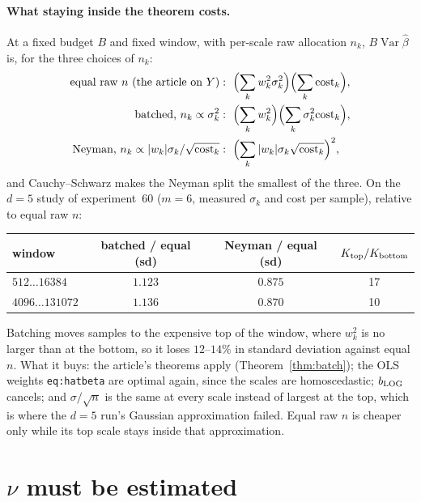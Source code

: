 \documentclass[11pt]{article}
\newcommand{\Var}{\operatorname{Var}}
\newcommand{\cost}{\mathrm{cost}}
\newcommand{\lbl}[1]{\texttt{#1}}
\begin{document}
\paragraph{What staying inside the theorem costs.} At a fixed budget $B$ and
fixed window, with per-scale raw allocation $n_k$, $B\Var\hat\beta$ is, for
the three choices of $n_k$:
\begin{align*}
  \text{equal raw $n$ (the article on $Y$)}&:\ \Bigl(\sum_kw_k^2\sigma_k^2\Bigr)\Bigl(\sum_k\cost_k\Bigr),\\
  \text{batched, $n_k\propto\sigma_k^2$}&:\ \Bigl(\sum_kw_k^2\Bigr)\Bigl(\sum_k\sigma_k^2\cost_k\Bigr),\\
  \text{Neyman, $n_k\propto|w_k|\sigma_k/\sqrt{\cost_k}$}&:\ \Bigl(\sum_k|w_k|\sigma_k\sqrt{\cost_k}\Bigr)^2,
\end{align*}
and Cauchy--Schwarz makes the Neyman split the smallest of the three. On the
$d=5$ study of experiment~60 ($m=6$, measured $\sigma_k$ and cost per
sample), relative to equal raw $n$:

\begin{center}
\begin{tabular}{@{}lccc@{}}
\toprule
window & batched / equal (sd) & Neyman / equal (sd) & $K_{\rm top}/K_{\rm bottom}$\\
\midrule
$512\ldots16384$ & $1.123$ & $0.875$ & 17\\
$4096\ldots131072$ & $1.136$ & $0.870$ & 10\\
\bottomrule
\end{tabular}
\end{center}

\noindent Batching moves samples to the expensive top of the window, where
$w_k^2$ is no larger than at the bottom, so it loses $12$--$14\%$ in standard
deviation against equal $n$. What it buys: the article's theorems apply
(Theorem~\ref{thm:batch}); the OLS weights \lbl{eq:hatbeta} are optimal again,
since the scales are homoscedastic; $b_{\rm LOG}$ cancels; and $\sigma/\sqrt n$
is the same at every scale instead of largest at the top, which is where the
$d=5$ run's Gaussian approximation failed. Equal raw $n$ is cheaper only while
its top scale stays inside that approximation.

\section{\texorpdfstring{$\nu$}{nu} must be estimated}\label{sec:nu}
\end{document}
